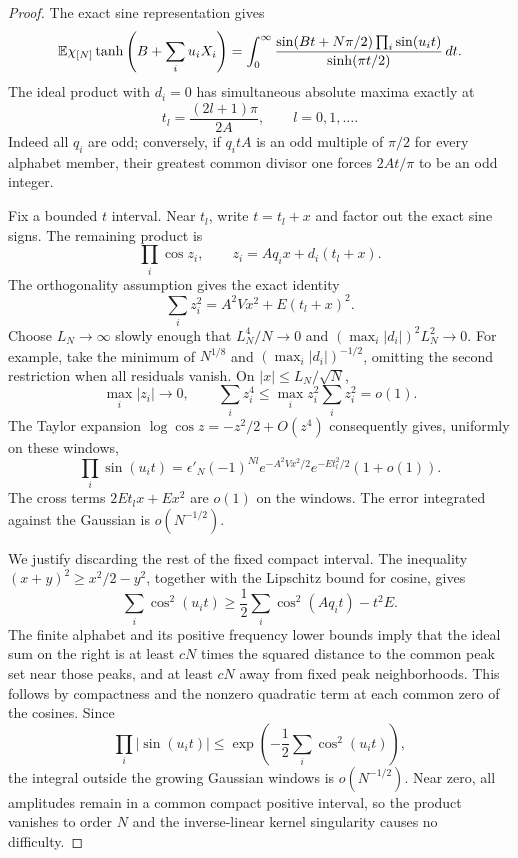 \begin{proof}
The exact sine representation gives
\begin{equation}\label{eq:bulk-sine-integral}
 \mathbb E\chi_{[N]}\tanh\left(B+\sum_i u_iX_i\right)
 =\int_0^\infty
 \frac{\sin(Bt+N\pi/2)\prod_i\sin(u_it)}{\sinh(\pi t/2)}\,dt.
\end{equation}
The ideal product with $d_i=0$ has simultaneous absolute maxima exactly
at
\[
 t_l=\frac{(2l+1)\pi}{2A},\qquad l=0,1,\ldots.
\]
Indeed all $q_i$ are odd; conversely, if $q_itA$ is an odd multiple of
$\pi/2$ for every alphabet member, their greatest common divisor one
forces $2At/\pi$ to be an odd integer.

Fix a bounded $t$ interval. Near $t_l$, write $t=t_l+x$ and factor out
the exact sine signs. The remaining product is
\[
 \prod_i\cos z_i,\qquad z_i=Aq_ix+d_i(t_l+x).
\]
The orthogonality assumption gives the exact identity
\[
 \sum_i z_i^2=A^2Vx^2+E(t_l+x)^2.
\]
Choose $L_N\to\infty$ slowly enough that
$L_N^4/N\to0$ and $(\max_i|d_i|)^2L_N^2\to0$.
For example, take the minimum of $N^{1/8}$ and
$(\max_i|d_i|)^{-1/2}$, omitting the second restriction when all
residuals vanish. On $|x|\le L_N/\sqrt N$,
\[
 \max_i|z_i|\to0,\qquad
 \sum_i z_i^4\le\max_i z_i^2\sum_i z_i^2=o(1).
\]
The Taylor expansion $\log\cos z=-z^2/2+O(z^4)$ consequently gives,
uniformly on these windows,
\begin{equation}\label{eq:residual-saddle}
 \prod_i\sin(u_it)
 =\epsilon'_N(-1)^{Nl}
   e^{-A^2Vx^2/2}e^{-Et_l^2/2}(1+o(1)).
\end{equation}
The cross terms $2Et_lx+Ex^2$ are $o(1)$ on the windows. The error
integrated against the Gaussian is $o(N^{-1/2})$.

We justify discarding the rest of the fixed compact interval. The
inequality $(x+y)^2\ge x^2/2-y^2$, together with the Lipschitz bound
for cosine, gives
\[
 \sum_i\cos^2(u_it)
 \ge\frac12\sum_i\cos^2(Aq_it)-t^2E.
\]
The finite alphabet and its positive frequency lower bounds imply
that the ideal sum on the right is at least $cN$ times the squared
distance to the common peak set near those peaks, and at least $cN$
away from fixed peak neighborhoods. This follows by compactness and
the nonzero quadratic term at each common zero of the cosines.
Since
\[
 \prod_i|\sin(u_it)|
 \le\exp\left(-\frac12\sum_i\cos^2(u_it)\right),
\]
the integral outside the growing Gaussian windows is $o(N^{-1/2})$.
Near zero, all amplitudes remain in a common compact positive interval,
so the product vanishes to order $N$ and the inverse-linear kernel
singularity causes no difficulty.


\end{proof}
